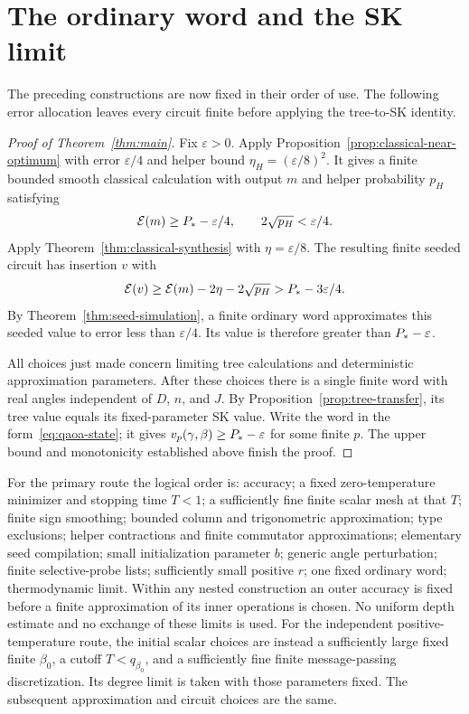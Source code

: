 \section{The ordinary word and the SK limit}\label{sec:conclusion}

The preceding constructions are now fixed in their order of use.
The following error allocation leaves every circuit finite before
applying the tree-to-SK identity.

\begin{proof}[Proof of Theorem~\ref{thm:main}]
Fix $\varepsilon>0$. Apply
Proposition~\ref{prop:classical-near-optimum} with error
$\varepsilon/4$ and helper bound $\eta_H=(\varepsilon/8)^2$.
It gives a finite bounded smooth classical calculation with output $m$
and helper probability $p_H$ satisfying
\[
 \mathcal E(m)\ge P_*-\varepsilon/4,
 \qquad 2\sqrt{p_H}<\varepsilon/4.
\]
Apply Theorem~\ref{thm:classical-synthesis} with $\eta=\varepsilon/8$.
The resulting finite seeded circuit has insertion $v$ with
\[
 \mathcal E(v)\ge\mathcal E(m)-2\eta-2\sqrt{p_H}
             >P_*-3\varepsilon/4.
\]
By Theorem~\ref{thm:seed-simulation}, a finite ordinary word approximates
this seeded value to error less than $\varepsilon/4$.
Its value is therefore greater than $P_*-\varepsilon$.

All choices just made concern limiting tree calculations and deterministic
approximation parameters. After these choices there is a single finite word
with real angles independent of $D$, $n$, and $J$. By
Proposition~\ref{prop:tree-transfer}, its tree value equals its fixed-parameter SK
value. Write the word in the form~\eqref{eq:qaoa-state}; it gives
$v_p(\gamma,\beta)\ge P_*-\varepsilon$ for some finite $p$.
The upper bound and monotonicity established above finish the proof.
\end{proof}

\begin{remark}\label{rem:order-of-choices}
For the primary route the logical order is: accuracy; a fixed
zero-temperature minimizer and stopping time $T<1$; a sufficiently
fine finite scalar mesh at that $T$; finite sign smoothing; bounded
column and trigonometric approximation; type exclusions;
helper contractions and finite commutator approximations;
elementary seed compilation; small initialization parameter $b$; generic
angle perturbation; finite selective-probe lists; sufficiently small
positive $r$; one fixed ordinary word; thermodynamic limit. Within any nested construction
an outer accuracy is fixed before a finite approximation of its inner
operations is chosen. No uniform depth estimate and no exchange of these
limits is used. For the independent positive-temperature route, the
initial scalar choices are instead a sufficiently large fixed finite
$\beta_0$, a cutoff $T<q_{\beta_0}$, and a sufficiently fine finite
message-passing discretization. Its degree limit is taken with those
parameters fixed. The subsequent approximation and circuit choices
are the same.
\end{remark}
